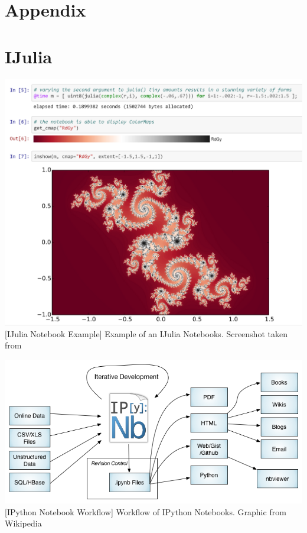 \setcounter{page}{1}

\begin{appendix}
\section*{Appendix}
{}

\section{IJulia}

\vspace{1em}
\begin{minipage}{\linewidth}
    \centering
    \includegraphics[width=0.9\linewidth]{graphics/ijnotebook.png}
    [IJulia Notebook Example]{
        Example of an IJulia Notebooks.
        Screenshot taken from \cite{IJuliaNotebook}
    }
    \label{fig:ijulianotebook}
\end{minipage}

\vspace{1em}
\begin{minipage}{\linewidth}
    \centering
    \includegraphics[width=0.9\linewidth]{graphics/IPython_Notebook_Workflows.png}
    [IPython Notebook Workflow]{
        Workflow of IPython Notebooks.
        Graphic from Wikipedia \cite{IPyhonNotebookFlow}
    }
    \label{fig:ipythonnotebookflow}
\end{minipage}

\end{appendix}
